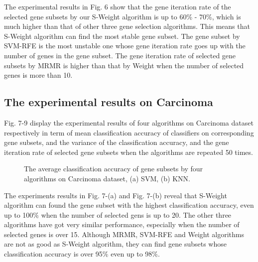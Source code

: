 \documentclass[runningheads,a4paper]{llncs}
\begin{document}
The experimental results in Fig. 6 show that the gene iteration rate of the selected gene subsets by our S-Weight algorithm is up to 60\% - 70\%, which is much higher than that of other three gene selection algorithms. This means that S-Weight algorithm can find the most stable gene subset. The gene subset by SVM-RFE is the most unstable one whose gene iteration rate goes up with the number of genes in the gene subset. The gene iteration rate of  selected gene subsets by MRMR is higher than  that by Weight when the number of selected genes is more than 10.

\subsection{The experimental results on Carcinoma }
Fig. 7-9 display the experimental results of four algorithms on Carcinoma dataset respectively in term of mean classification accuracy of classifiers on corresponding gene subsets, and the variance of the classification accuracy, and the gene iteration rate of selected gene subsets when the algorithms are repeated 50 times.

\begin{figure}
\centering
{}
\hspace{0.5cm}
\caption{The average classification accuracy of gene subsets by four algorithms on Carcinoma dataset, (a) SVM, (b) KNN.}
\label{fig:fig7}
\end{figure}

The experiments results in Fig. 7-(a) and Fig. 7-(b) reveal that S-Weight algorithm can found the gene subset with the highest classification accuracy, even up to 100\% when the number of selected gens is up to 20. The other three algorithms have got very similar performance, especially when the number of selected genes is over 15. Although MRMR, SVM-RFE and Weight algorithms are not as good as S-Weight algorithm, they can find gene subsets whose classification accuracy is over 95\% even up to 98\%. 
\end{document}
